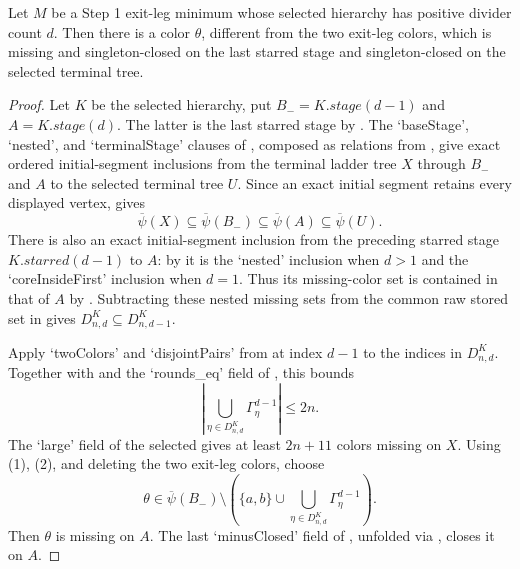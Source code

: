 \begin{lemma}
Let $M$ be a Step 1 exit-leg minimum whose selected hierarchy has
positive divider count $d$.  Then there is a color $\theta$, different
from the two exit-leg colors, which is missing and singleton-closed on
the last starred stage and singleton-closed on the selected terminal
tree.
\end{lemma}
\begin{proof}
Let $K$ be the selected hierarchy, put
$B_-=K.\mathit{stage}(d-1)$ and
$A=K.\mathit{stage}(d)$.  The latter is the last starred stage by
.  The `baseStage', `nested', and
`terminalStage' clauses of , composed as
relations from , give exact ordered
initial-segment inclusions from the terminal ladder tree $X$ through
$B_-$ and $A$ to the selected terminal tree $U$.  Since an exact initial
segment retains every displayed vertex, 
gives
\[
 \overline\psi(X)\subseteq\overline\psi(B_-)
 \subseteq\overline\psi(A)\subseteq\overline\psi(U).       \tag{1}
\]
There is also an exact initial-segment inclusion from the preceding
starred stage $K.\mathit{starred}(d-1)$ to $A$: by
 it is the `nested' inclusion when $d>1$
and the `coreInsideFirst' inclusion when $d=1$.  Thus its missing-color
set is contained in that of $A$ by .
Subtracting these nested missing sets from the common raw stored set in
 gives
$D^K_{n,d}\subseteq D^K_{n,d-1}$.

Apply `twoColors' and `disjointPairs' from
 at index $d-1$ to the indices in
$D^K_{n,d}$.  Together with
 and the `rounds_eq' field of
, this bounds
\[
 \left|\bigcup_{\eta\in D^K_{n,d}}\Gamma^{d-1}_\eta\right|
 \leq 2n.                                                    \tag{2}
\]
The `large' field of the selected
 gives at least $2n+11$ colors missing
on $X$.
Using (1), (2), and deleting the two exit-leg colors, choose
\[
 \theta\in\overline\psi(B_-)
 \setminus\left(\{a,b\}\cup
   \bigcup_{\eta\in D^K_{n,d}}\Gamma^{d-1}_\eta\right).
\]
Then $\theta$ is missing on $A$.  The last `minusClosed' field of
, unfolded via
, closes it on $A$.


\end{proof}
